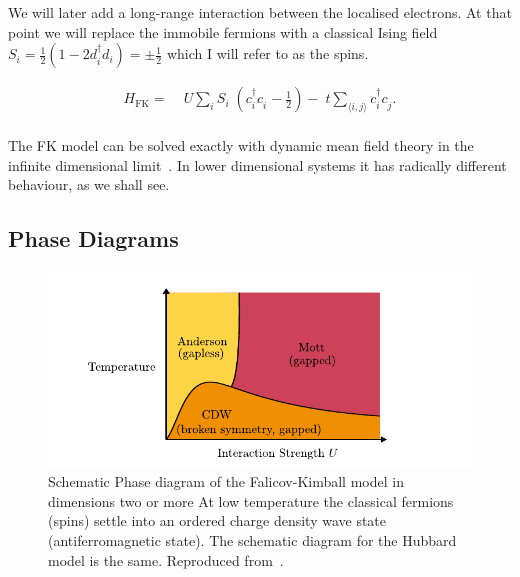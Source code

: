 We will later add a long-range interaction between the localised electrons. At that point we will replace the immobile fermions with a classical Ising field \(S_i = \tfrac{1}{2}(1 - 2d^\dagger_id_i) = \pm\tfrac{1}{2}\) which I will refer to as the spins.

\[\begin{aligned}
H_{\mathrm{FK}} = & \;U \sum_{i} S_i\;(c^\dagger_{i}c^{\phantom{\dagger}}_{i} - \tfrac{1}{2}) -\;t \sum_{\langle i,j\rangle} c^\dagger_{i}c^{\phantom{\dagger}}_{j}.\\ 
\end{aligned}\]

The FK model can be solved exactly with dynamic mean field theory in the infinite dimensional limit~\autocite{antipovCriticalExponentsStrongly2014,ribicNonlocalCorrelationsSpectral2016,freericksExactDynamicalMeanfield2003,herrmannNonequilibriumDynamicalCluster2016}. In lower dimensional systems it has radically different behaviour, as we shall see.

\hypertarget{phase-diagrams}{%
\subsection{Phase Diagrams}\label{phase-diagrams}}

\hypertarget{fig:fk_phase_diagram}{%
\begin{figure}
\centering
\includegraphics[width=1\textwidth,height=\textheight]{figure_code/background_chapter/fk_phase_diagram}
\caption[{Falicov-Kimball Temperature-Interaction Phase Diagrams}]{Schematic Phase diagram of the Falicov-Kimball model in dimensions two or more At low temperature the classical fermions (spins) settle into an ordered charge density wave state (antiferromagnetic state). The schematic diagram for the Hubbard model is the same. Reproduced from~\autocite{antipovInteractionTunedAndersonMott2016,antipovCriticalExponentsStrongly2014}.}
\label{fig:fk_phase_diagram}
\end{figure}
}

